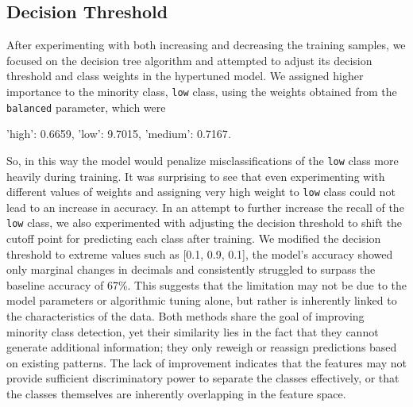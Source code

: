 \subsection{Decision Threshold}

After experimenting with both increasing and decreasing the training samples, 
we focused on the decision tree algorithm and attempted to adjust its decision threshold and class weights in the hypertuned model. 
We assigned higher importance to the minority class, \texttt{low} class, using the weights obtained from the \texttt{balanced} parameter, 
which were 
\begin{center}
  {'high': 0.6659, 'low': 9.7015, 'medium': 0.7167}.  
\end{center} So, in this way the model would penalize misclassifications of the \texttt{low} class more heavily during training.
It was surprising to see that even experimenting with different values of weights and assigning very high weight to \texttt{low} 
class could not lead to an increase in accuracy. In an attempt to further increase 
the recall of the \texttt{low} class, we also experimented with adjusting the decision threshold 
to shift the cutoff point for predicting each class after training.
We modified the decision threshold to extreme values such as [0.1, 0.9, 0.1], the model's accuracy showed only marginal changes in decimals and 
consistently struggled to surpass the baseline accuracy of 67\%. 
This suggests that the limitation may not be due to the model parameters or algorithmic tuning alone, 
but rather is inherently linked to the characteristics of the data.  
Both methods share the goal of improving minority class detection, yet their similarity lies in the fact that they cannot generate additional information; 
they only reweigh or reassign predictions based on existing patterns. 
The lack of improvement indicates that the features may not provide sufficient discriminatory power 
to separate the classes effectively, or that the classes themselves are inherently overlapping in the feature space. 

